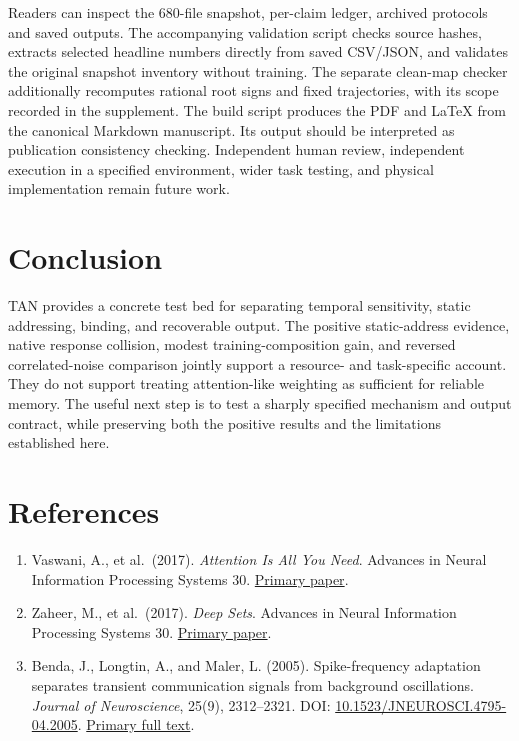 \documentclass[
  10pt,
]{article}
\providecommand{\tightlist}{%
  \setlength{\itemsep}{0pt}\setlength{\parskip}{0pt}}
\begin{document}
Readers can inspect the 680-file snapshot, per-claim ledger, archived
protocols and saved outputs. The accompanying validation script checks
source hashes, extracts selected headline numbers directly from saved
CSV/JSON, and validates the original snapshot inventory without
training. The separate clean-map checker additionally recomputes
rational root signs and fixed trajectories, with its scope recorded in
the supplement. The build script produces the PDF and LaTeX from the
canonical Markdown manuscript. Its output should be interpreted as
publication consistency checking. Independent human review, independent
execution in a specified environment, wider task testing, and physical
implementation remain future work.

\section{Conclusion}\label{conclusion}

TAN provides a concrete test bed for separating temporal sensitivity,
static addressing, binding, and recoverable output. The positive
static-address evidence, native response collision, modest
training-composition gain, and reversed correlated-noise comparison
jointly support a resource- and task-specific account. They do not
support treating attention-like weighting as sufficient for reliable
memory. The useful next step is to test a sharply specified mechanism
and output contract, while preserving both the positive results and the
limitations established here.

\section{References}\label{references}

\begin{enumerate}
\def\labelenumi{\arabic{enumi}.}
\tightlist
\item
  Vaswani, A., et al.~(2017). \emph{Attention Is All You Need}. Advances
  in Neural Information Processing Systems 30.
  \href{https://arxiv.org/abs/1706.03762}{Primary paper}.
\item
  Zaheer, M., et al.~(2017). \emph{Deep Sets}. Advances in Neural
  Information Processing Systems 30.
  \href{https://arxiv.org/abs/1703.06114}{Primary paper}.
\item
  Benda, J., Longtin, A., and Maler, L. (2005). Spike-frequency
  adaptation separates transient communication signals from background
  oscillations. \emph{Journal of Neuroscience}, 25(9), 2312--2321. DOI:
  \href{https://doi.org/10.1523/JNEUROSCI.4795-04.2005}{10.1523/JNEUROSCI.4795-04.2005}.
  \href{https://pmc.ncbi.nlm.nih.gov/articles/PMC6726095/}{Primary full
  text}.
\end{enumerate}
\end{document}
